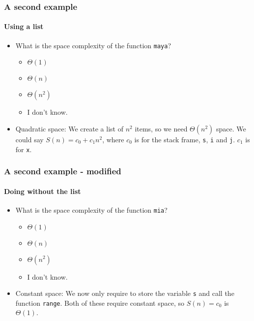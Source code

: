 \begin{frame}
	\frametitle{A second example}
	\framesubtitle{Using a list}
	
			\begin{itemize}
				\item What is the space complexity of the function \texttt{maya}?
			\begin{itemize}
				\item $\Theta(1)$
				\item $\Theta(n)$ 
				\item $\Theta(n^2)$
				\item I don't know.
			\end{itemize}
	
				\item Quadratic space:
		We create a list of $n^2$ items, so we need $\Theta(n^2)$ space. We could say $S(n) = c_0 + c_1n^2$, where $c_0$ is
		for the stack frame, \texttt{s}, \texttt{i} and \texttt{j}. $c_1$ is for \texttt{x}.
	\end{itemize}
	


\end{frame}

\begin{frame}
	\frametitle{A second example - modified}
	\framesubtitle{Doing without the list}
			\begin{itemize}
				\item What is the space complexity of the function \texttt{mia}?
			\begin{itemize}
				\item $\Theta(1)$
				\item $\Theta(n)$ 
				\item $\Theta(n^2)$
				\item I don't know.
			\end{itemize}
	
				\item Constant space:
		We now only require to store the variable \texttt{s} and call the function \texttt{range}. Both of these require
		constant space, so $S(n) = c_0$ is $\Theta(1)$.
	\end{itemize}
	
			

\end{frame}

